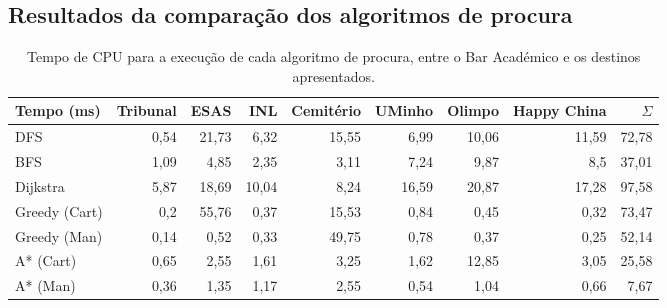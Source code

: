 \documentclass[12pt, a4paper]{article}
\begin{document}


\subsection{Resultados da comparação dos algoritmos de procura}
\label{comparison-data}

\begin{table}[H]
    \small

    \begin{adjustwidth}{-1.5cm}{-1.5cm}
        \begin{center}
            \begin{tabular}{|l|r|r|r|r|r|r|r|r|}
                \hline
                    Tempo (ms)  &
                    Tribunal    &
                    ESAS        &
                    INL         &
                    Cemitério   &
                    UMinho      &
                    Olimpo      &
                    Happy China &
                    $\Sigma$    \\

                \hline
                DFS & 0,54 & 21,73 & 6,32 & 15,55 & 6,99 & 10,06 & 11,59 & 72,78 \\
                \hline
                BFS & 1,09 & 4,85 & 2,35 & 3,11 & 7,24 & 9,87 & 8,5 & 37,01 \\
                \hline
                Dijkstra & 5,87 & 18,69 & 10,04 & 8,24 & 16,59 & 20,87 & 17,28 & 97,58 \\
                \hline
                Greedy (Cart) & 0,2 & 55,76 & 0,37 & 15,53 & 0,84 & 0,45 & 0,32 & 73,47 \\
                \hline
                Greedy (Man) & 0,14 & 0,52 & 0,33 & 49,75 & 0,78 & 0,37 & 0,25 & 52,14 \\
                \hline
                A* (Cart) & 0,65 & 2,55 & 1,61 & 3,25 & 1,62 & 12,85 & 3,05 & 25,58 \\
                \hline
                A* (Man) & 0,36 & 1,35 & 1,17 & 2,55 & 0,54 & 1,04 & 0,66 & 7,67 \\
                \hline
            \end{tabular}
        \end{center}
    \end{adjustwidth}

    \caption{
        Tempo de CPU para a execução de cada algoritmo de procura, entre o Bar Académico e os
        destinos apresentados.
    }
\end{table}
\end{document}
